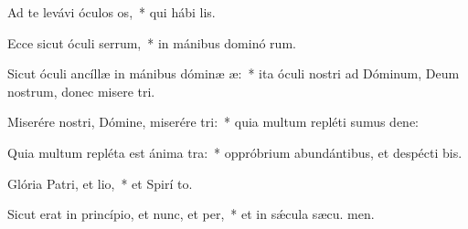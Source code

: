 \item Ad te levávi óculos os,~* qui hábi  lis.
\item Ecce sicut óculi serrum,~* in mánibus dominó rum.
\item Sicut óculi ancíllæ in mánibus dóminæ æ:~* ita óculi nostri ad Dóminum, Deum nostrum, donec misere tri.
\item Miserére nostri, Dómine, miserére tri:~* quia multum repléti sumus dene:
\item Quia multum repléta est ánima tra:~* oppróbrium abundántibus, et despécti bis.
\item Glória Patri, et lio,~* et Spirí to.
\item Sicut erat in princípio, et nunc, et per,~* et in sǽcula sæcu. men.
